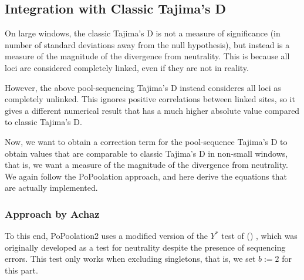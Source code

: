 \documentclass[a4paper,fontsize=9pt,DIV=14]{scrartcl}
\newcounter{todo}
\newcommand\todo[1]{}
\newcommand\citeay[1]{\citeauthor{#1} (\citeyear{#1}) \cite{#1}}
\begin{document}


\subsection{Integration with Classic Tajima's D}
\label{supp:sec:TajimaD:sub:Classic}

On large windows, the classic Tajima's D is not a measure of significance (in number of standard deviations away from the null hypothesis), but instead is a measure of the magnitude of the divergence from neutrality.
This is because all loci are considered completely linked, even if they are not in reality.

However, the above pool-sequencing Tajima's D instead consideres all loci as completely unlinked.
This ignores positive correlations between linked sites, so it gives a different numerical result that has a much higher absolute value compared to classic Tajima's D.

Now, we want to obtain a correction term for the pool-sequence Tajima's D to obtain values that are comparable to classic Tajima's D in non-small windows, that is, we want a measure of the magnitude of the divergence from neutrality.
We again follow the PoPoolation approach, and here derive the equations that are actually implemented.


\subsubsection*{Approach by Achaz}

To this end, PoPoolation2 uses a modified version of the $Y^*$ test of \citeay{Achaz2008},
which was originally developed as a test for neutrality despite the presence of sequencing errors.
This test only works when excluding singletons, that is, we set $b:=2$ for this part.
\end{document}

